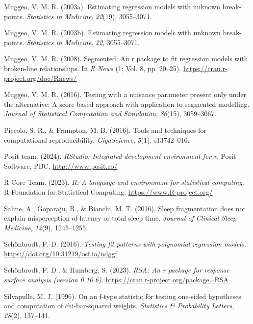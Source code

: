 \documentclass[
]{article}
\newlength{\cslhangindent}
\newenvironment{CSLReferences}[2] %
 {\begin{list}{}{%
  \setlength{\itemindent}{0pt}
  \setlength{\leftmargin}{0pt}
  \setlength{\parsep}{0pt}
  \ifodd #1
   \setlength{\leftmargin}{\cslhangindent}
   \setlength{\itemindent}{-1\cslhangindent}
  \fi
  \setlength{\itemsep}{#2\baselineskip}}}
 {\end{list}}
\begin{document}
\begin{CSLReferences}{1}{0}
Muggeo, V. M. R. (2003a). Estimating regression models with unknown break-points. \emph{Statistics in Medicine}, \emph{22}(19), 3055--3071.

Muggeo, V. M. R. (2003b). Estimating regression models with unknown break-points. \emph{Statistics in Medicine}, \emph{22}, 3055--3071.

Muggeo, V. M. R. (2008). Segmented: An r package to fit regression models with broken-line relationships. In \emph{R News} (1; Vol. 8, pp. 20--25). \url{https://cran.r-project.org/doc/Rnews/}

Muggeo, V. M. R. (2016). Testing with a nuisance parameter present only under the alternative: A score-based approach with application to segmented modelling. \emph{Journal of Statistical Computation and Simulation}, \emph{86}(15), 3059--3067.

Piccolo, S. R., \& Frampton, M. B. (2016). Tools and techniques for computational reproducibility. \emph{GigaScience}, \emph{5}(1), s13742--016.

Posit team. (2024). \emph{RStudio: Integrated development environment for r}. Posit Software, PBC. \url{http://www.posit.co/}

R Core Team. (2023). \emph{R: A language and environment for statistical computing}. R Foundation for Statistical Computing. \url{https://www.R-project.org/}

Saline, A., Goparaju, B., \& Bianchi, M. T. (2016). Sleep fragmentation does not explain misperception of latency or total sleep time. \emph{Journal of Clinical Sleep Medicine}, \emph{12}(9), 1245--1255.

Schönbrodt, F. D. (2016). \emph{Testing fit patterns with polynomial regression models}. \url{https://doi.org/10.31219/osf.io/ndggf}

Schönbrodt, F. D., \& Humberg, S. (2023). \emph{{RSA}: An r package for response surface analysis (version 0.10.6)}. \url{https://cran.r-project.org/package=RSA}

Silvapulle, M. J. (1996). On an f-type statistic for testing one-sided hypotheses and computation of chi-bar-squared weights. \emph{Statistics \& Probability Letters}, \emph{28}(2), 137--141.


\end{CSLReferences}
\end{document}
